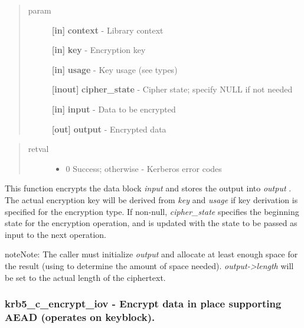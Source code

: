 \documentclass[letterpaper,10pt,english]{sphinxmanual}
\begin{document}
\begin{quote}\begin{description}
\item[{param}] \leavevmode
\textbf{{[}in{]}} \textbf{context} - Library context

\textbf{{[}in{]}} \textbf{key} - Encryption key

\textbf{{[}in{]}} \textbf{usage} - Key usage (see  types)

\textbf{{[}inout{]}} \textbf{cipher\_state} - Cipher state; specify NULL if not needed

\textbf{{[}in{]}} \textbf{input} - Data to be encrypted

\textbf{{[}out{]}} \textbf{output} - Encrypted data

\end{description}\end{quote}
\begin{quote}\begin{description}
\item[{retval}] \leavevmode\begin{itemize}
\item {} 
0   Success; otherwise - Kerberos error codes

\end{itemize}

\end{description}\end{quote}

This function encrypts the data block \emph{input} and stores the output into \emph{output} . The actual encryption key will be derived from \emph{key} and \emph{usage} if key derivation is specified for the encryption type. If non-null, \emph{cipher\_state} specifies the beginning state for the encryption operation, and is updated with the state to be passed as input to the next operation.

\begin{notice}{note}{Note:}
The caller must initialize \emph{output} and allocate at least enough space for the result (using {\hyperref[appdev/refs/api/krb5_c_encrypt_length:c.krb5_c_encrypt_length]{}} to determine the amount of space needed). \emph{output-\textgreater{}length} will be set to the actual length of the ciphertext.
\end{notice}


\subsubsection{krb5\_c\_encrypt\_iov -  Encrypt data in place supporting AEAD (operates on keyblock).}
\label{appdev/refs/api/krb5_c_encrypt_iov:krb5-c-encrypt-iov-encrypt-data-in-place-supporting-aead-operates-on-keyblock}\label{appdev/refs/api/krb5_c_encrypt_iov::doc}
\end{document}
